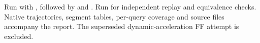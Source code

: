 \documentclass[11pt,a4paper]{article}
\begin{document}
Run  with , followed by  and . Run  for independent replay and equivalence checks. Native trajectories, segment tables, per-query coverage and source files accompany the report. The superseded dynamic-acceleration FF attempt is excluded.
\end{document}
